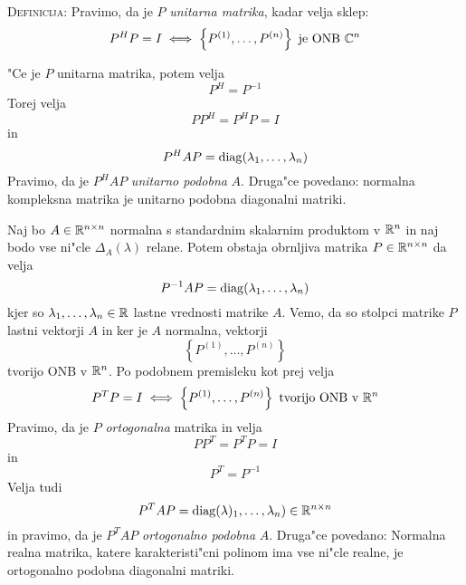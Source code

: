 \textsc{Definicija:} Pravimo, da je $P$ \emph{unitarna matrika}, kadar velja sklep:
\begin{equation*}
P^H P = I \iff \left\{ P^{(1)}, \ldots, P^{(n)} \right\} \text{ je ONB $\mathbb{C}^n$}
\end{equation*}

"Ce je $P$ unitarna matrika, potem velja
\begin{equation*}
P^H = P^{-1}
\end{equation*}
Torej velja
\begin{equation*}
P P^H = P^H P = I
\end{equation*}
in
\begin{equation*}
P^H AP = \operatorname{diag} (\lambda_1, \ldots, \lambda_n)
\end{equation*}
Pravimo, da je $P^H AP$ \emph{unitarno podobna} $A$. Druga"ce povedano: normalna kompleksna matrika je unitarno podobna diagonalni matriki.

Naj bo $A \in \mathbb{R}^{n \times n}$ normalna s standardnim skalarnim produktom v $\mathbb{R}^n$ in naj bodo vse ni"cle $\Delta_A(\lambda)$ relane. Potem obstaja obrnljiva matrika $P \in \mathbb{R}^{n \times n}$ da velja
\begin{equation*}
P^{-1} AP = \operatorname{diag}(\lambda_1, \ldots, \lambda_n)
\end{equation*}
kjer so $\lambda_1, \ldots, \lambda_n \in \mathbb{R}$ lastne vrednosti matrike $A$. Vemo, da so stolpci matrike $P$ lastni vektorji $A$ in ker je $A$ normalna, vektorji
\begin{equation*}
\left\{ P^{(1)}, \ldots, P^{(n)} \right\}
\end{equation*}
tvorijo ONB v $\mathbb{R}^n$. Po podobnem premisleku kot prej velja
\begin{equation*}
P^T P = I \iff \left\{ P^{(1)}, \ldots, P^{(n)} \right\} \text{ tvorijo ONB v $\mathbb{R}^n$}
\end{equation*}
Pravimo, da je $P$ \emph{ortogonalna} matrika in velja
\begin{equation*}
P P^T = P^T P = I
\end{equation*}
in
\begin{equation*}
P^T = P^{-1}
\end{equation*}
Velja tudi
\begin{equation*}
P^T AP = \operatorname{diag} (\lambda)_1, \ldots, \lambda_n) \in \mathbb{R}^{n \times n}
\end{equation*}
in pravimo, da je $P^TAP$ \emph{ortogonalno podobna} $A$. Druga"ce povedano: Normalna realna matrika, katere karakteristi"cni polinom ima vse ni"cle realne, je ortogonalno podobna diagonalni matriki.

